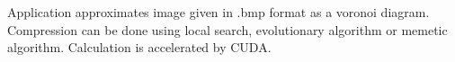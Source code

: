 Application approximates image given in .bmp format as a voronoi diagram. Compression can be done using local search, evolutionary algorithm or memetic algorithm. Calculation is accelerated by C\+U\+DA. 